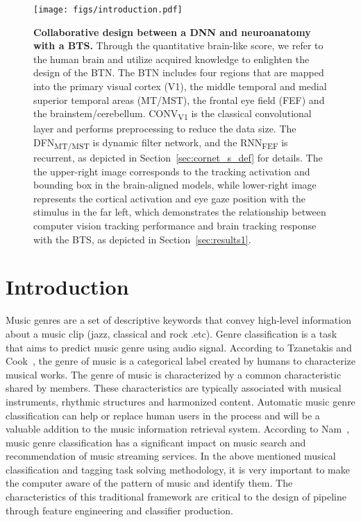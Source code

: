 \documentclass[final,3p,times,twocolumn]{elsarticle}
\begin{document}
\begin{figure}
	\centering
	\texttt{[image: figs/introduction.pdf]}
	\caption{
		\textbf{
		Collaborative design between a DNN and neuroanatomy with a BTS.} 
		Through the quantitative brain-like score, we refer to the human brain and utilize acquired knowledge to enlighten the design of the BTN. 
		The BTN includes four regions that are mapped into the 		primary visual cortex (V1), 
		the middle temporal and medial superior temporal areas (MT/MST), the frontal eye field (FEF) and the brainstem/cerebellum. 
		CONV\textsubscript{V1} is the classical convolutional layer and performs preprocessing to reduce the data size.
		The DFN\textsubscript{MT/MST} is dynamic filter network, and the RNN\textsubscript{FEF} is recurrent, as depicted in Section~\ref{sec:cornet_s_def} for details.
		The the upper-right image corresponds to the tracking activation and bounding box in the brain-aligned models, 
		while lower-right image represents the cortical activation and eye gaze position with the stimulus in the far left,
		which demonstrates the relationship between computer vision tracking performance and brain tracking response with the BTS, as depicted in Section~\ref{sec:results1}.
	}
	\label{fig:introduction}
\end{figure}


\section{Introduction}
Music genres are a set of descriptive keywords that convey high-level information about a music clip (jazz, classical and rock .etc).
Genre classification is a task that aims to predict music genre using audio signal.
According to Tzanetakis and Cook~\cite{tzanetakis2002musical}, the genre of music is a categorical label created by humans to characterize musical works.
The genre of music is characterized by a common characteristic shared by members.
These characteristics are typically associated with musical instruments, rhythmic structures and harmonized content.
Automatic music genre classification can help or replace human users in the process and will be a valuable addition to the music information retrieval system.
According to Nam~\cite{nam2018deep}, music genre classification has a significant impact on music search and recommendation of music streaming services.
In the above mentioned musical classification and tagging task solving methodology, it is very important to make the computer aware of the pattern of music and identify them.
The characteristics of this traditional framework are critical to the design of pipeline through feature engineering and classifier production.
\end{document}
